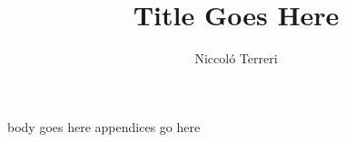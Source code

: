 \documentclass[12pt, twoside, a4paper, draft]{report}
\author{Niccol\'o Terreri}
\title{Title Goes Here}
\begin{document}
\maketitle
body goes here
\appendix
appendices go here
\end{document}
